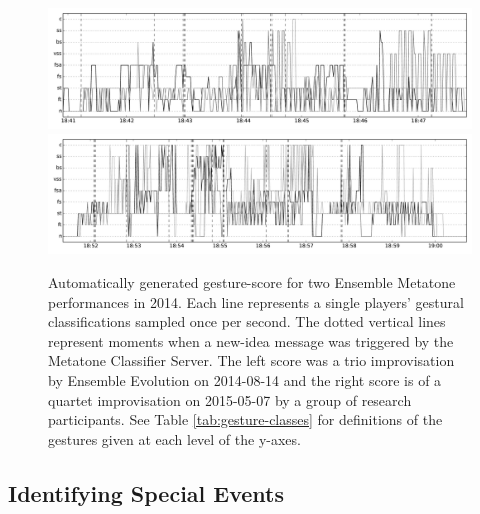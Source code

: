 \documentclass[graybox]{svmult}
\begin{document}

\begin{figure}
\centering
\includegraphics[width=0.9\textheight,angle=90,origin=c]{figures/Performance-14-08-14-18_40-bw.pdf}
\includegraphics[width=0.9\textheight,angle=90,origin=c]{figures/gesture-score-15-05-07-18-52-bw.pdf}
\caption{Automatically generated gesture-score for two Ensemble
  Metatone performances in 2014. Each line represents a
  single players' gestural classifications sampled once per second.
  The dotted vertical lines represent moments when a new-idea
  message was triggered by the Metatone Classifier Server. The left
  score was a trio improvisation by Ensemble Evolution on 2014-08-14
  and the right score is of a quartet improvisation on 2015-05-07 by a
  group of research participants. See Table \ref{tab:gesture-classes}
  for definitions of the gestures given at each level of the y-axes.}
\label{gesturescore}
\end{figure}


\subsection{Identifying Special Events}
\label{subsec:special-events}
\end{document}

